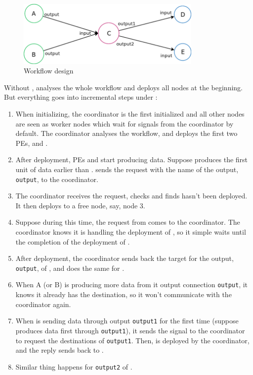 \begin{figure}[h]\centering
    \includegraphics[width=0.8\textwidth]{figures/incdep_example_0}
	\caption{Workflow design}
	\label{fig:incdep_example_0}
\end{figure}

Without \tincdep, \dpy analyses the whole workflow and deploys all nodes at the beginning. But everything goes into incremental steps under \tincdep:

\begin{enumerate}
	\item When initializing, the coordinator is the first initialized and all other nodes are seen as worker nodes which wait for signals from the coordinator by default. The coordinator analyses the workflow, and deploys the first two PEs, \ndA and \ndB.
	\item After deployment, PEs \ndA and \ndB start producing data. Suppose \ndA produces the first unit of data earlier than \ndB. \ndA sends the request with the name of the output, \lstinline|output|, to the coordinator.
	\item The coordinator receives the request, checks and finds \ndC hasn't been deployed. It then deploys \ndC to a free node, say, node 3.
	\item Suppose during this time, the request from \ndB comes to the coordinator. The coordinator knows it is handling the deployment of \ndC, so it simple waits until the completion of the deployment of \ndC.
	\item After deployment, the coordinator sends back the target for the output, \lstinline|output|, of \ndA, and does the same for \ndB.
	\item When A (or B) is producing more data from it output connection \lstinline|output|, it knows it already has the destination, so it won't communicate with the coordinator again.
	\item When \ndC is sending data through output \lstinline|output1| for the first time (suppose \ndC produces data first through \lstinline|output1|), it sends the signal to the coordinator to request the destinations of \lstinline|output1|. Then, \ndD is deployed by the coordinator, and the reply sends back to \ndC.
	\item Similar thing happens for \lstinline|output2| of \ndC.
\end{enumerate}

